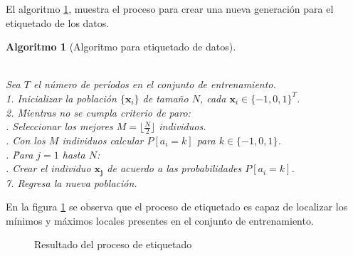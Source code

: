 \documentclass[12pt]{report}
\theoremstyle{break}
\theoremstyle{break}
\newtheorem{algoritmo}{Algoritmo}[chapter]
\begin{document}
El algoritmo \ref{algo:etiquetado}, muestra el proceso para crear una nueva generación para el etiquetado de los datos.

\begin{algoritmo}[Algoritmo para etiquetado de datos]
\begin{tabbing}
\\ Sea $T$ el número de períodos en el conjunto de entrenamiento.
\\1. Inicializar la población $\{\mathbf{x}_i\}$ de tamaño $N$, cada $\mathbf{x}_i \in \{-1, 0, 1\}^{T}$. \\
2. \=Mientras no se cumpla criterio de paro: \\
 . Seleccionar los mejores $M =\lfloor \tfrac{N}{2} \rfloor$ individuos.\\
 . Con los $M$ individuos calcular $P[a_i = k]$ para $k \in \{-1, 0, 1\}$. \\
 . \= Para $j = 1$ hasta $N$:\\
 \>. Crear el individuo $\mathbf{x_j}$ de acuerdo a las probabilidades $P[a_i = k]$. \\

7. Regresa la nueva población. 
\end{tabbing}
\label{algo:etiquetado}
\end{algoritmo}

En la figura \ref{imagen:etiquetado} se observa que el proceso de etiquetado es capaz de localizar los mínimos y máximos locales presentes en el conjunto de entrenamiento.

\begin{figure}[ht]
\centering
{}
\caption{\label{imagen:etiquetado} Resultado del proceso de etiquetado}
\end{figure}
\end{document}

